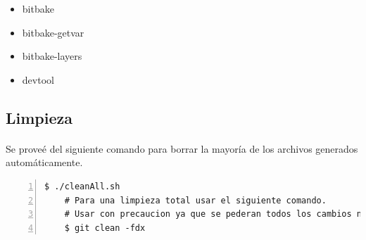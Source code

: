 \begin{itemize}
    \item bitbake
    \item bitbake-getvar
    \item bitbake-layers
    \item devtool
\end{itemize}

\subsection{Limpieza}

\paragraph{}Se proveé del siguiente comando para borrar la mayoría de los archivos generados
automáticamente.

\begin{lstlisting}[style=consola, numbers=left]
    $ ./cleanAll.sh
    # Para una limpieza total usar el siguiente comando.
    # Usar con precaucion ya que se pederan todos los cambios no guardados en git.
    $ git clean -fdx
\end{lstlisting}


